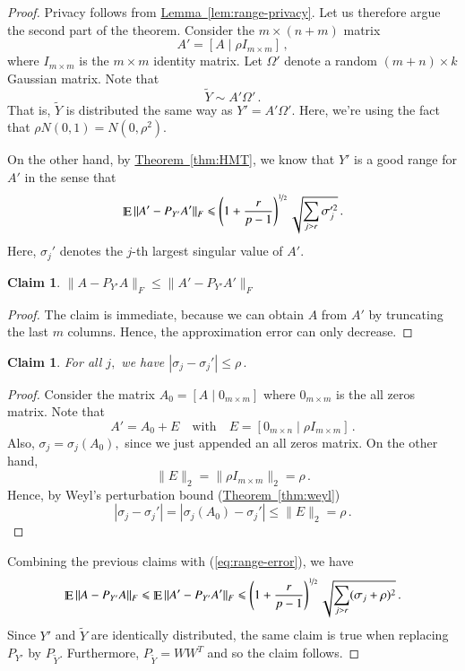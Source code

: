 \documentclass[letterpaper,11pt]{article}
\newtheorem{claim}[theorem]{Claim}
\theoremstyle{definition}
\newcommand{\claimlabel}[1]{\label{claim:#1}}
\newcommand{\lemmaref}[1]{\hyperref[lem:#1]{Lemma~\ref{lem:#1}}}
\newcommand{\theoremref}[1]{\hyperref[thm:#1]{Theorem~\ref{thm:#1}}}
\newcommand{\Esymb}{\mathbb{E}}
\DeclareMathOperator*{\E}{\Esymb}
\newcommand{\nfrac}{\nicefrac}
\newcommand{\mper}{\,.}
\newcommand{\mcom}{\,,}
\renewcommand{\le}{\leqslant}
\begin{document}
\begin{proof}
Privacy follows from \lemmaref{range-privacy}. Let us therefore argue the
second part of the theorem. Consider the $m\times (n+m)$ matrix
\[
A' = [ A \mid \rho I_{m\times m} ]\mcom
\]
where $I_{m\times m}$ is the $m\times m$ identity matrix. Let $\Omega'$ denote
a random $(m+n)\times k$ Gaussian matrix.
Note that
\[
\tilde Y \sim A'\Omega'\mper
\]
That is, $\tilde Y$ is distributed the same way as $Y'=A'\Omega'.$ Here, we're
using the fact that $\rho N(0,1)= N(0,\rho^2).$

On the other hand, by \theoremref{HMT}, we know that $Y'$ is a good range for
$A'$ in the sense that
\begin{equation}\label{eq:range-error}
\E\|A'-P_{Y'}A'\|_F
\le \left(1+\frac r{p-1}\right)^{\nfrac12}\sqrt{\sum_{j>r}\sigma_j'^2}\mper
\end{equation}
Here, $\sigma_j'$ denotes the $j$-th largest singular value of $A'.$

\begin{claim}\claimlabel{one}
$ \|A-P_{Y'}A\|_F
\le \|A'-P_{Y'}A'\|_F
$
\end{claim}
\begin{proof}
The claim is immediate, because we can obtain $A$ from $A'$ by truncating the
last $m$ columns. Hence, the approximation error can only decrease.
\end{proof}

\begin{claim}\claimlabel{two}
For all $j,$ we have $ |\sigma_j-\sigma_j'|\le\rho\mper$
\end{claim}

\begin{proof}
Consider the matrix $A_0 = [ A \mid 0_{m\times m} ]$ where $0_{m\times m}$ is
the all zeros matrix. Note that
\[
A' = A_0 + E \quad\text{with}\quad E=[ 0_{m\times n} \mid \rho I_{m\times m}]\mper
\]
Also, $\sigma_j=\sigma_j(A_0),$ since we just appended an all zeros matrix.
On the other hand,
\[
\|E\|_2=\|\rho I_{m\times m}\|_2= \rho\mper
\]
Hence, by Weyl's perturbation bound (\theoremref{weyl})
\[
|\sigma_j-\sigma_j'|
= |\sigma_j(A_0)-\sigma_j'|
\le \|E\|_2=\rho\mper
\]
\end{proof}

Combining the previous claims with (\ref{eq:range-error}), we have
\[
\E\|A-P_{Y'}A\|_F
 \le \E\|A'-P_{Y'}A'\|_F
 \le
\left(1+\frac r{p-1}\right)^{\nfrac12}\sqrt{\sum_{j>r}(\sigma_j+\rho)^2}
\mper
\]
Since $Y'$ and $\tilde Y$ are identically distributed, the same claim is true
when replacing $P_{Y'}$ by $P_{\tilde Y}.$ Furthermore, $P_{\tilde Y}=WW^T$
and so the claim follows.
\end{proof}
\end{document}
